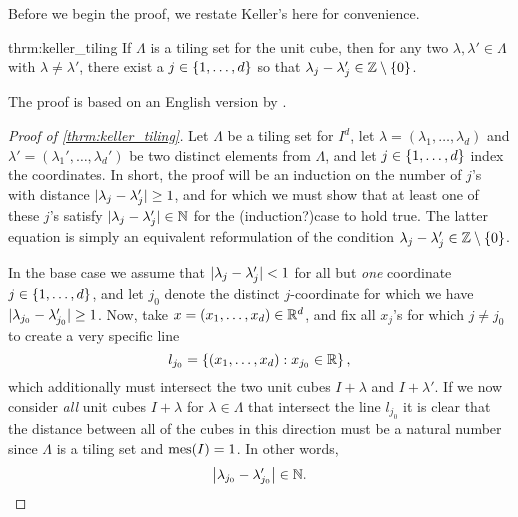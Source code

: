 \documentclass[../thesis.tex]{subfiles}
\begin{document}
Before we begin the proof, we restate Keller's  here for convenience. 
\begin{reptheorem}{thrm:keller_tiling}
    If $\Lambda$ is a tiling set for the unit cube, then for any two $\lambda, \lambda' \in \Lambda$ with $\lambda\neq\lambda'$, there exist a $j\in \{1,\dots,d\}$ so that $\lambda_j-\lambda_j' \in \mathbb{Z}\setminus\{0\}$.
\end{reptheorem}

The proof is based on an English version by \cite{iosevichSpectralTilingProperties1998}.

\begin{proof}[Proof of \cref{thrm:keller_tiling}]
    Let $\Lambda$ be a tiling set for $I^d$, let $\lambda = (\lambda_1,\dots,\lambda_d)$ and $\lambda' = (\lambda_1',\dots,\lambda_d')$ be two distinct elements from $\Lambda$, and let $j\in\{1,\dots, d\}$ index the coordinates. In short, the proof will be an induction on the number of $j$'s with distance $ |\lambda_j-\lambda_j'|\geq 1$, and for which we must show that at least one of these $j$'s satisfy $|\lambda_{j}-\lambda_{j}'| \in \mathbb{N}$ for the (induction?)case to hold true. The latter equation is simply an equivalent reformulation of the condition $\lambda_{j}-\lambda_{j}' \in \mathbb{Z}\setminus\{0\}$.

    In the base case we assume that $|\lambda_j-\lambda_j' |< 1 $ for all but \emph{one} coordinate $j\in \{1,\dots,d\}$, and let $j_0$ denote the distinct $j$-coordinate for which we have $|\lambda_{j_0}-\lambda_{j_0}'| \geq 1$. Now, take $x=(x_1,\dots,x_d)\in \mathbb{R}^d$, and fix all $x_j$'s for which $j\neq j_0$ to create a very specific line
    \begin{equation*}
        l_{j_0} = \left\{\left(x_1,\dots,x_d\right) : x_{j_0} \in \mathbb{R} \right\},
    \end{equation*}
    which additionally must intersect the two unit cubes $I+\lambda$ and $I+\lambda'$. If we now consider \emph{all} unit cubes $I+\lambda$ for $\lambda \in \Lambda$ that intersect the line $l_{j_0}$ it is clear that the distance between all of the cubes in this direction must be a natural number since $\Lambda$ is a tiling set and $\operatorname{mes}(I)=1$. In other words,
    \begin{equation*}
        \left|\lambda_{j_0}-\lambda_{j_0}'\right| \in \mathbb{N}.
    \end{equation*}


\end{proof}
\end{document}

